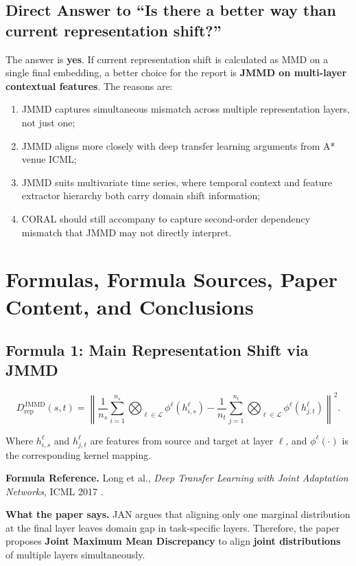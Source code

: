 \documentclass[a4paper]{article}
\begin{document}
\subsection{Direct Answer to ``Is there a better way than current representation shift?''}

The answer is \textbf{yes}. If current representation shift is calculated as MMD on a single final embedding, a better choice for the report is \textbf{JMMD on multi-layer contextual features}. The reasons are:
\begin{enumerate}[label=\arabic*.]
    \item JMMD captures simultaneous mismatch across multiple representation layers, not just one;
    \item JMMD aligns more closely with deep transfer learning arguments from A* venue ICML;
    \item JMMD suits multivariate time series, where temporal context and feature extractor hierarchy both carry domain shift information;
    \item CORAL should still accompany to capture second-order dependency mismatch that JMMD may not directly interpret.
\end{enumerate}

\section{Formulas, Formula Sources, Paper Content, and Conclusions}

\subsection{Formula 1: Main Representation Shift via JMMD}

\[
D_{\mathrm{rep}}^{\mathrm{JMMD}}(s,t)
= \left\|
\frac{1}{n_s}\sum_{i=1}^{n_s} \bigotimes_{\ell \in \mathcal{L}} \phi^{\ell}(h_{i,s}^{\ell})
-
\frac{1}{n_t}\sum_{j=1}^{n_t} \bigotimes_{\ell \in \mathcal{L}} \phi^{\ell}(h_{j,t}^{\ell})
\right\|^2.
\]

Where \(h_{i,s}^{\ell}\) and \(h_{j,t}^{\ell}\) are features from source and target at layer \(\ell\), and \(\phi^{\ell}(\cdot)\) is the corresponding kernel mapping.

\textbf{Formula Reference.} Long et al., \emph{Deep Transfer Learning with Joint Adaptation Networks}, ICML 2017 \cite{jan}.

\textbf{What the paper says.} JAN argues that aligning only one marginal distribution at the final layer leaves domain gap in task-specific layers. Therefore, the paper proposes \textbf{Joint Maximum Mean Discrepancy} to align \textbf{joint distributions} of multiple layers simultaneously.
\end{document}
